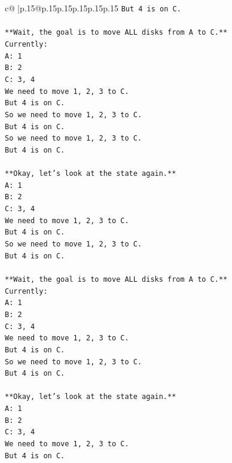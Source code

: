 \documentclass{article}
\begin{document}
{\begin{supertabular}{c@{$\;$}|p{.15\linewidth}@{}p{.15\linewidth}p{.15\linewidth}p{.15\linewidth}p{.15\linewidth}p{.15\linewidth}}
{{{\texttt{But 4 is on C.} \\
\\ 
\texttt{**Wait, the goal is to move ALL disks from A to C.**} \\
\texttt{Currently:} \\
\texttt{A: 1} \\
\texttt{B: 2} \\
\texttt{C: 3, 4} \\
\texttt{We need to move 1, 2, 3 to C.} \\
\texttt{But 4 is on C.} \\
\texttt{So we need to move 1, 2, 3 to C.} \\
\texttt{But 4 is on C.} \\
\texttt{So we need to move 1, 2, 3 to C.} \\
\texttt{But 4 is on C.} \\
\\ 
\texttt{**Okay, let's look at the state again.**} \\
\texttt{A: 1} \\
\texttt{B: 2} \\
\texttt{C: 3, 4} \\
\texttt{We need to move 1, 2, 3 to C.} \\
\texttt{But 4 is on C.} \\
\texttt{So we need to move 1, 2, 3 to C.} \\
\texttt{But 4 is on C.} \\
\\ 
\texttt{**Wait, the goal is to move ALL disks from A to C.**} \\
\texttt{Currently:} \\
\texttt{A: 1} \\
\texttt{B: 2} \\
\texttt{C: 3, 4} \\
\texttt{We need to move 1, 2, 3 to C.} \\
\texttt{But 4 is on C.} \\
\texttt{So we need to move 1, 2, 3 to C.} \\
\texttt{But 4 is on C.} \\
\\ 
\texttt{**Okay, let's look at the state again.**} \\
\texttt{A: 1} \\
\texttt{B: 2} \\
\texttt{C: 3, 4} \\
\texttt{We need to move 1, 2, 3 to C.} \\
\texttt{But 4 is on C.} \\
}}}
\end{supertabular}}
\end{document}
